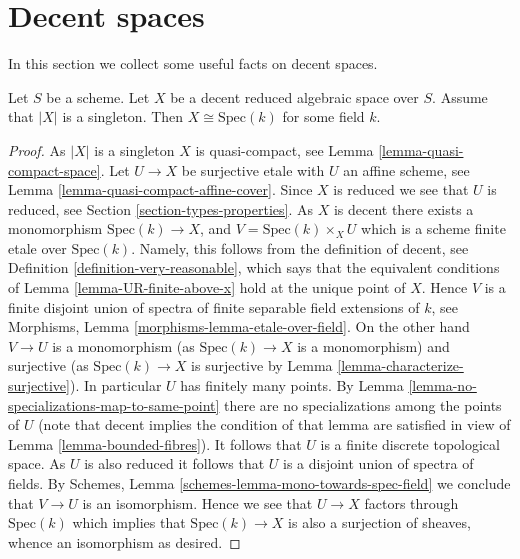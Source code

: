 \section{Decent spaces}
\label{section-decent}

\noindent
In this section we collect some useful facts on decent spaces.

\begin{lemma}
\label{lemma-when-field}
Let $S$ be a scheme.
Let $X$ be a decent reduced algebraic space over $S$.
Assume that $|X|$ is a singleton.
Then $X \cong \text{Spec}(k)$ for some field $k$.
\end{lemma}

\begin{proof}
As $|X|$ is a singleton $X$ is quasi-compact, see
Lemma \ref{lemma-quasi-compact-space}.
Let $U \to X$ be surjective etale with $U$ an affine scheme, see
Lemma \ref{lemma-quasi-compact-affine-cover}.
Since $X$ is reduced we see that $U$ is reduced, see
Section \ref{section-types-properties}.
As $X$ is decent there exists a monomorphism $\text{Spec}(k) \to X$,
and $V = \text{Spec}(k) \times_X U$ which is a scheme finite etale
over $\text{Spec}(k)$. Namely, this
follows from the definition of decent, see
Definition \ref{definition-very-reasonable},
which says that the equivalent conditions of
Lemma \ref{lemma-UR-finite-above-x}
hold at the unique point of $X$. Hence $V$ is a finite disjoint union of
spectra of finite separable field extensions of $k$, see
Morphisms, Lemma \ref{morphisms-lemma-etale-over-field}.
On the other hand $V \to U$ is a monomorphism (as $\text{Spec}(k) \to X$
is a monomorphism) and surjective (as $\text{Spec}(k) \to X$ is surjective by
Lemma \ref{lemma-characterize-surjective}).
In particular $U$ has finitely many points.
By Lemma \ref{lemma-no-specializations-map-to-same-point}
there are no specializations among the points of $U$ (note that decent
implies the condition of that lemma are satisfied in view of
Lemma \ref{lemma-bounded-fibres}).
It follows that $U$ is a finite discrete topological space.
As $U$ is also reduced it follows that $U$ is a disjoint union
of spectra of fields. By
Schemes, Lemma \ref{schemes-lemma-mono-towards-spec-field}
we conclude that $V \to U$ is an isomorphism. Hence we see that
$U \to X$ factors through $\text{Spec}(k)$ which implies that
$\text{Spec}(k) \to X$ is also a surjection of sheaves, whence
an isomorphism as desired.
\end{proof}














